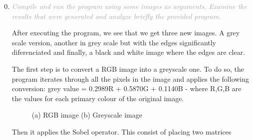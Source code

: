 \documentclass{article}
\newcommand{\greyItem}[1]{\item\emph{\textcolor{darkgray}{#1}}}
\begin{document}
\begin{enumerate}[label=5.\arabic*,leftmargin=*]
    \setcounter{enumi}{-1}

\greyItem{Compile and run the program using some images as arguments. Examine the results that were generated and analyze briefly the provided program.}

After executing the program, we see that we get three new images. A grey scale version, another in grey scale but with the edges significantly diferenciated and finally, a black and white image where the edges are clear. 

The first step is to convert a RGB image into a greyscale one. To do so, the program iterates through all the pixels in the image and applies the following conversion:  grey value = 0.2989R + 0.5870G + 0.1140B - where R,G,B are the values for each primary colour of the original image.

\begin{figure}[htbp]
    \centering
    \caption{(a) RGB image (b) Greyscale image }
    \label{fig:foobar}
\end{figure}

Then it applies the Sobel operator. This consist of placing two matrices


\end{enumerate}
\end{document}
